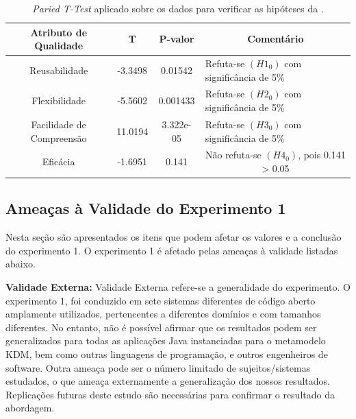 \begin{table}[]
\centering
\caption{\textit{Paried T-Test} aplicado sobre os dados para verificar as hipóteses da .}
\label{tab:experimento_1_10_15}
\begin{tabular}{|m{1cm}|l|l|m{7.1cm}|}
\hline
\multicolumn{1}{|c|}{Atributo de Qualidade} & \multicolumn{1}{c|}{T} & \multicolumn{1}{c|}{P-valor} & \multicolumn{1}{c|}{Comentário} \\ \hline
\multicolumn{1}{|c|}{Reusabilidade} & \multicolumn{1}{c|}{-3.3498} & \multicolumn{1}{c|}{0.01542} & Refuta-se \textbf{$(H1_{0})$} com significância de 5\%\\ \hline
\multicolumn{1}{|c|}{Flexibilidade} &\multicolumn{1}{c|}{-5.5602}& \multicolumn{1}{c|}{0.001433} &Refuta-se \textbf{$(H2_{0})$} com significância de 5\%\\ \hline
\multicolumn{1}{|c|}{Facilidade de Compreensão} & \multicolumn{1}{c|}{11.0194} &    \multicolumn{1}{c|}{3.322e-05}&Refuta-se \textbf{$(H3_{0})$} com significância de 5\%\\ \hline
\multicolumn{1}{|c|}{Eficácia}&\multicolumn{1}{c|}{-1.6951}&\multicolumn{1}{c|}{0.141}&\multicolumn{1}{c|}{Não refuta-se \textbf{$(H4_{0})$}, pois 0.141 > 0.05}\\ \hline
\end{tabular}
\end{table}

\subsection{Ameaças à Validade do Experimento 1}

Nesta seção são apresentados os itens que podem afetar os valores e a conclusão do experimento 1. O experimento 1 é afetado pelas ameaças à validade listadas abaixo.

\textbf{Validade Externa:} Validade Externa refere-se a generalidade do experimento. O experimento 1, foi conduzido em sete sistemas diferentes de código aberto amplamente utilizados, pertencentes a diferentes domínios e com tamanhos diferentes. No entanto, não é possível afirmar que os resultados podem ser generalizados para todas as aplicações Java instanciadas para o metamodelo KDM, bem como outras linguagens de programação, e outros engenheiros de software. Outra ameaça pode ser o número limitado de sujeitos/sistemas estudados, o que ameaça externamente a generalização dos nossos resultados. Replicações futuras deste estudo são necessárias para confirmar o resultado da abordagem.


